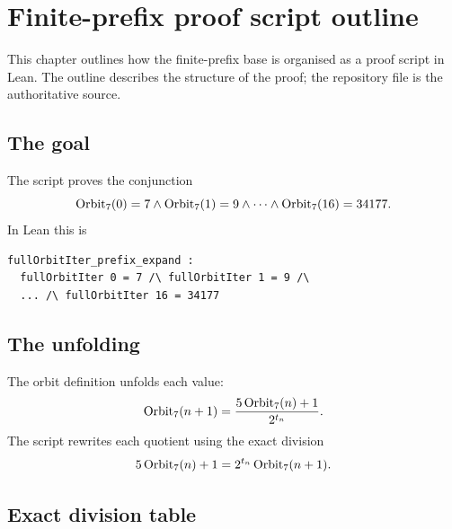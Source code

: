 \section{Finite-prefix proof script outline}

This chapter outlines how the finite-prefix base is organised as a
proof script in Lean.  The outline describes the structure of the
proof; the repository file is the authoritative source.

\subsection{The goal}

The script proves the conjunction
\begin{equation*}
  \mathrm{Orbit}_7(0)=7\land\mathrm{Orbit}_7(1)=9\land\cdots\land\mathrm{Orbit}_7(16)=34177.
\end{equation*}
In Lean this is
\begin{verbatim}
fullOrbitIter_prefix_expand :
  fullOrbitIter 0 = 7 /\ fullOrbitIter 1 = 9 /\
  ... /\ fullOrbitIter 16 = 34177
\end{verbatim}

\subsection{The unfolding}

The orbit definition unfolds each value:
\begin{equation*}
  \mathrm{Orbit}_7(n+1)=\frac{5\,\mathrm{Orbit}_7(n)+1}{2^{t_n}}.
\end{equation*}
The script rewrites each quotient using the exact division
\begin{equation*}
  5\,\mathrm{Orbit}_7(n)+1=2^{t_n}\,\mathrm{Orbit}_7(n+1).
\end{equation*}

\subsection{Exact division table}

